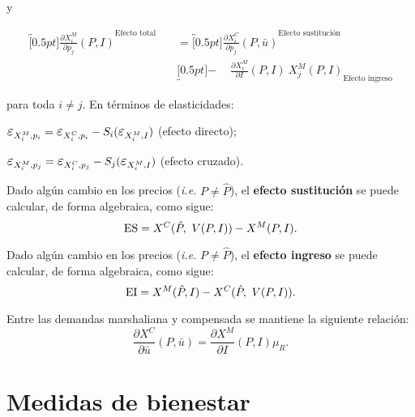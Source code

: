 \documentclass[8pt,a4paper]{extarticle}
\begin{document}
\begin{multicols}{3}
\begin{boxtheo}[Ecuación de Slutsky]
		y

		\begin{equation*}
			\begin{aligned}
				\overbracket[0.5pt]{\frac{\partial X^M_i}{\partial p_j} (P, I)}^{\text{Efecto total}} \quad & = \overbracket[0.5pt]{\frac{\partial X^C_i}{\partial p_j} (P, \bar{u})}^{\text{Efecto sustitución}}           \\
				                                                                                            & \underbracket[0.5pt]{ - \quad\ \frac{\partial X_i^M}{\partial I} (P, I)\ X^M_j (P,I)}_{\text{Efecto ingreso}}
			\end{aligned}
		\end{equation*}

		para toda $i \neq j$. En términos de elasticidades:

		\begin{eqlist}
			\item $\E_{X_i^M, p_i} = \E_{X_i^C, p_i} - S_i ( \E_{X_i^M, I})$ (efecto directo);
			\item $\E_{X_i^M, p_j} = \E_{X_i^C, p_j} - S_j ( \E_{X_i^M, I})$ (efecto cruzado).
		\end{eqlist}

	\end{boxtheo}

	\begin{boxdef}
		Dado algún cambio en los precios (\emph{i.e.} $P \neq \hat{P}$), el \textbf{efecto sustitución} se puede calcular, de forma algebraica, como sigue:
		\[
			\text{\normalfont ES} = X^C (\hat{P},\ V(P, I)) - X^M(P, I)
			.\]
	\end{boxdef}

	\begin{boxdef}
		Dado algún cambio en los precios (\emph{i.e.} $P \neq \hat{P}$), el \textbf{efecto ingreso} se puede calcular, de forma algebraica, como sigue:
		\[
			\text{\normalfont EI} = X^M(\hat{P}, I) - X^C(\hat{P},\ V(P, I))
			.\]
	\end{boxdef}

	\begin{boxtheo}
		Entre las demandas marshaliana y compensada se mantiene la siguiente relación:
		\[
			\frac{\partial X^C}{\partial \bar{u}} (P, \bar{u}) = \frac{\partial X^M}{\partial I} (P, I) \mu_R
			.\]
	\end{boxtheo}

	\newpage

	\section{Medidas de bienestar}


\end{multicols}
\end{document}
